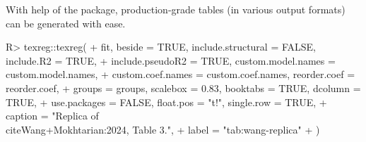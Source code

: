 \documentclass[%
    twoside, openright, titlepage, numbers=noenddot,%
    cleardoublepage=empty,%
    abstract=false,%
    BCOR=5.5mm, paper=a5, fontsize=10pt,%
]{scrreprt}
\begin{document}
%
%
With help of the  package, production-grade tables (in various output formats) can be generated with ease.
%
\begin{Schunk}
\begin{Sinput}
R> texreg::texreg(
+    fit, beside = TRUE, include.structural = FALSE, include.R2 = TRUE,
+    include.pseudoR2 = TRUE, custom.model.names = custom.model.names,
+    custom.coef.names = custom.coef.names, reorder.coef = reorder.coef,
+    groups = groups, scalebox = 0.83, booktabs = TRUE, dcolumn = TRUE,
+    use.packages = FALSE, float.pos = "t!", single.row = TRUE,
+    caption = "Replica of \\cite{Wang+Mokhtarian:2024}, Table 3.",
+    label = "tab:wang-replica"
+  )
\end{Sinput}
\begin{table}[t!]
\begin{center}
\end{center}
\end{table}
\end{Schunk}
\end{document}
